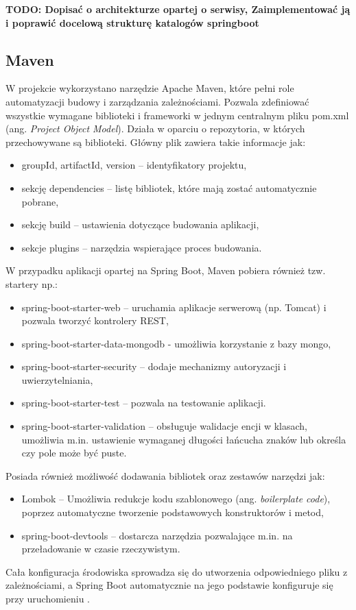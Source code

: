 \textbf{TODO: Dopisać o architekturze opartej o serwisy, Zaimplementować ją i poprawić docelową strukturę katalogów springboot}
\subsection*{Maven}
W projekcie wykorzystano narzędzie Apache Maven, które pełni role automatyzacji budowy i zarządzania zależnościami. Pozwala zdefiniować wszystkie wymagane biblioteki i frameworki w jednym centralnym pliku pom.xml (ang. \textit{Project Object Model}). Działa w oparciu o repozytoria, w których przechowywane są biblioteki. Główny plik zawiera takie informacje jak:
\begin{itemize}
	\item groupId, artifactId, version -- identyfikatory projektu,
	\item sekcję dependencies -- listę bibliotek, które mają zostać automatycznie pobrane,
	\item sekcję build -- ustawienia dotyczące budowania aplikacji,
	\item sekcje plugins -- narzędzia wspierające proces budowania.
\end{itemize}
W przypadku aplikacji opartej na Spring Boot, Maven pobiera również tzw. startery np.:
\begin{itemize}
	\item spring-boot-starter-web -- uruchamia aplikacje serwerową (np. Tomcat) i pozwala tworzyć kontrolery REST,
	\item spring-boot-starter-data-mongodb - umożliwia korzystanie z bazy mongo,
	\item spring-boot-starter-security -- dodaje mechanizmy autoryzacji i uwierzytelniania,
	\item spring-boot-starter-test -- pozwala na testowanie aplikacji.
	\item spring-boot-starter-validation -- obsługuje walidacje encji w klasach, umożliwia m.in. ustawienie wymaganej długości łańcucha znaków lub określa czy pole może być puste.
\end{itemize}
Posiada również możliwość dodawania bibliotek oraz zestawów narzędzi jak:
\begin{itemize}
	\item Lombok -- Umożliwia redukcje kodu szablonowego (ang. \textit{boilerplate code}), poprzez automatyczne tworzenie podstawowych konstruktorów i metod,
	\item spring-boot-devtools -- dostarcza narzędzia pozwalające m.in. na przeładowanie w czasie rzeczywistym.
\end{itemize}
Cała konfiguracja środowiska sprowadza się do utworzenia odpowiedniego pliku z zależnościami, a Spring Boot automatycznie na jego podstawie konfiguruje się przy uruchomieniu \cite{MavenDocs}.
